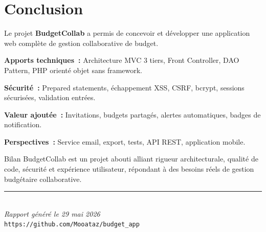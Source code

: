 \documentclass[12pt,a4paper,twoside]{report}
\begin{document}
\chapter{Conclusion}

Le projet \textbf{BudgetCollab} a permis de concevoir et développer une application web complète de gestion collaborative de budget.

\textbf{Apports techniques~:} Architecture MVC 3 tiers, Front Controller, DAO Pattern, PHP orienté objet sans framework.

\textbf{Sécurité~:} Prepared statements, échappement XSS, CSRF, bcrypt, sessions sécurisées, validation entrées.

\textbf{Valeur ajoutée~:} Invitations, budgets partagés, alertes automatiques, badges de notification.

\textbf{Perspectives~:} Service email, export, tests, API REST, application mobile.

\begin{successbox}{Bilan}
  BudgetCollab est un projet abouti alliant rigueur architecturale, qualité de code, sécurité et expérience utilisateur, répondant à des besoins réels de gestion budgétaire collaborative.
\end{successbox}

\vfill
\begin{center}
  \rule{0.4\textwidth}{0.5pt}\\[0.5cm]
  {\small\textit{Rapport généré le 29 mai 2026}}\\[0.2cm]
  {\small\textcolor{textsecondary}{\texttt{https://github.com/Mooataz/budget\_app}}}
\end{center}
\end{document}
